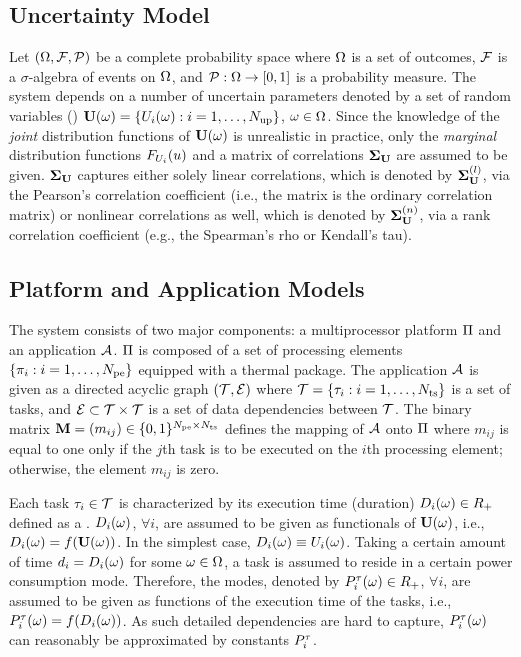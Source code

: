 \subsection{Uncertainty Model} 
Let $(\Omega, \mathcal{F}, \mathcal{P})$ be a complete probability space \cite{durrett2010} where $\Omega$ is a set of outcomes, $\mathcal{F}$ is a $\sigma$-algebra of events on $\Omega$, and $\mathcal{P}: \Omega \to [0, 1]$ is a probability measure. The system depends on a number of uncertain parameters denoted by a set of random variables (\rvs) $\mathbf{U}(\omega) = \{ U_i(\omega): i = 1, \dots, {N_\text{up}} \}$, $\omega \in \Omega$. Since the knowledge of the \emph{joint} distribution functions of $\mathbf{U}(\omega)$ is unrealistic in practice, only the \emph{marginal} distribution functions $F_{U_i}(u)$ and a matrix of correlations $\mathbf{\Sigma}_{\mathbf{U}}$ are assumed to be given. $\mathbf{\Sigma}_{\mathbf{U}}$ captures either solely linear correlations, which is denoted by $\mathbf{\Sigma}^{(l)}_{\mathbf{U}}$, via the Pearson's correlation coefficient (i.e., the matrix is the ordinary correlation matrix) or nonlinear correlations as well, which is denoted by $\mathbf{\Sigma}^{(n)}_{\mathbf{U}}$, via a rank correlation coefficient (e.g., the Spearman's rho or Kendall's tau).

\subsection{Platform and Application Models}  
The system consists of two major components: a multiprocessor platform $\Pi$ and an application $\mathcal{A}$. $\Pi$ is composed of a set of processing elements $\{ \pi_i: i = 1, \dots, {N_\text{pe}} \}$ equipped with a thermal package. The application $\mathcal{A}$ is given as a directed acyclic graph $(\mathcal{T}, \mathcal{E})$ where $\mathcal{T} = \{ \tau_i: i = 1, \dots, {N_\text{ts}} \}$ is a set of tasks, and $\mathcal{E} \subset \mathcal{T} \times \mathcal{T}$ is a set of data dependencies between $\mathcal{T}$. The binary matrix $\mathbf{M} = (m_{ij}) \in \{ 0, 1 \}^{{N_\text{pe}} \times {N_\text{ts}}}$ defines the mapping of $\mathcal{A}$ onto $\Pi$ where $m_{ij}$ is equal to one only if the $j$th task is to be executed on the $i$th processing element; otherwise, the element $m_{ij}$ is zero.

Each task $\tau_i \in \mathcal{T}$ is characterized by its execution time (duration) $D_i(\omega) \in R_+$ defined as a \rv. $D_i(\omega)$, $\forall i$, are assumed to be given as functionals of $\mathbf{U}(\omega)$, i.e., $D_i(\omega) = f(\mathbf{U}(\omega))$. In the simplest case, $D_i(\omega) \equiv U_i(\omega)$. Taking a certain amount of time $d_i = D_i(\omega)$ for some $\omega \in \Omega$, a task is assumed to reside in a certain power consumption mode. Therefore, the modes, denoted by $P^\tau_i(\omega) \in R_+$, $\forall i$, are assumed to be given as functions of the execution time of the tasks, i.e., $P^\tau_i(\omega) = f(D_i(\omega))$. As such detailed dependencies are hard to capture, $P^\tau_i(\omega)$ can reasonably be approximated by constants $P^\tau_i$.
